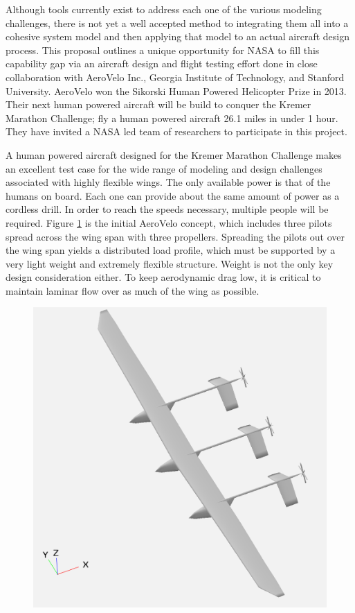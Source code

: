 \documentclass[]{aiaa-tc}
\begin{document}
    Although tools currently exist to address each one of the various modeling challenges, there is not yet a well 
    accepted method to integrating them all into a cohesive system model and then applying that model to an actual 
    aircraft design process. This proposal outlines a unique opportunity for NASA to fill this capability gap
    via an aircraft design and flight testing effort done in close collaboration with AeroVelo Inc., Georgia Institute of Technology, 
    and Stanford University. AeroVelo won the Sikorski Human Powered Helicopter Prize in 2013. Their next human powered aircraft will be 
    build to conquer the Kremer Marathon Challenge; fly a human powered aircraft 26.1 miles in under 1 hour. 
    They have invited a NASA led team of researchers to participate in this project. 

    A human powered aircraft designed for the Kremer Marathon Challenge makes an excellent test case for the 
    wide range of modeling and design challenges associated with highly flexible wings. 
    The only available power is that of the humans on board. Each one can provide about the 
    same amount of power as a cordless drill. In order to reach the speeds necessary, multiple people will be required. 
    Figure \ref{fig:aerovelo-concept} is the initial AeroVelo concept, which includes three pilots spread across the wing
    span with three propellers. Spreading the pilots out over the wing span yields a distributed load profile, 
    which must be supported by a very light weight and extremely flexible structure. Weight is not the only 
    key design consideration either. To keep aerodynamic drag low, it is critical to maintain laminar flow 
    over as much of the wing as possible. 

    \begin{figure}
        \includegraphics[width=\textwidth]{images/vsp_concept_solid}
        \caption{}
        \label{fig:aerovelo-concept}
    \end{figure}
\end{document}
